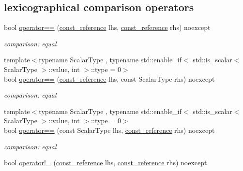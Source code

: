 \subsection*{lexicographical comparison operators}
\begin{DoxyCompactItemize}
\item 
bool \mbox{\hyperlink{classnlohmann_1_1basic__json_a122640e7e2db1814fc7bbb3c122ec76e}{operator==}} (\mbox{\hyperlink{classnlohmann_1_1basic__json_a4057c5425f4faacfe39a8046871786ca}{const\+\_\+reference}} lhs, \mbox{\hyperlink{classnlohmann_1_1basic__json_a4057c5425f4faacfe39a8046871786ca}{const\+\_\+reference}} rhs) noexcept
\begin{DoxyCompactList}\small\item\em comparison\+: equal \end{DoxyCompactList}\item 
{\footnotesize template$<$typename Scalar\+Type , typename std\+::enable\+\_\+if$<$ std\+::is\+\_\+scalar$<$ Scalar\+Type $>$\+::value, int $>$\+::type  = 0$>$ }\\bool \mbox{\hyperlink{classnlohmann_1_1basic__json_aba21440ea1aff44f718285ed7d6d20d9}{operator==}} (\mbox{\hyperlink{classnlohmann_1_1basic__json_a4057c5425f4faacfe39a8046871786ca}{const\+\_\+reference}} lhs, const Scalar\+Type rhs) noexcept
\begin{DoxyCompactList}\small\item\em comparison\+: equal \end{DoxyCompactList}\item 
{\footnotesize template$<$typename Scalar\+Type , typename std\+::enable\+\_\+if$<$ std\+::is\+\_\+scalar$<$ Scalar\+Type $>$\+::value, int $>$\+::type  = 0$>$ }\\bool \mbox{\hyperlink{classnlohmann_1_1basic__json_aef302e3ae215e46e5035d0e4fdf47235}{operator==}} (const Scalar\+Type lhs, \mbox{\hyperlink{classnlohmann_1_1basic__json_a4057c5425f4faacfe39a8046871786ca}{const\+\_\+reference}} rhs) noexcept
\begin{DoxyCompactList}\small\item\em comparison\+: equal \end{DoxyCompactList}\item 
bool \mbox{\hyperlink{classnlohmann_1_1basic__json_a6e2e21da48f5d9471716cd868a068327}{operator!=}} (\mbox{\hyperlink{classnlohmann_1_1basic__json_a4057c5425f4faacfe39a8046871786ca}{const\+\_\+reference}} lhs, \mbox{\hyperlink{classnlohmann_1_1basic__json_a4057c5425f4faacfe39a8046871786ca}{const\+\_\+reference}} rhs) noexcept

\end{DoxyCompactItemize}
